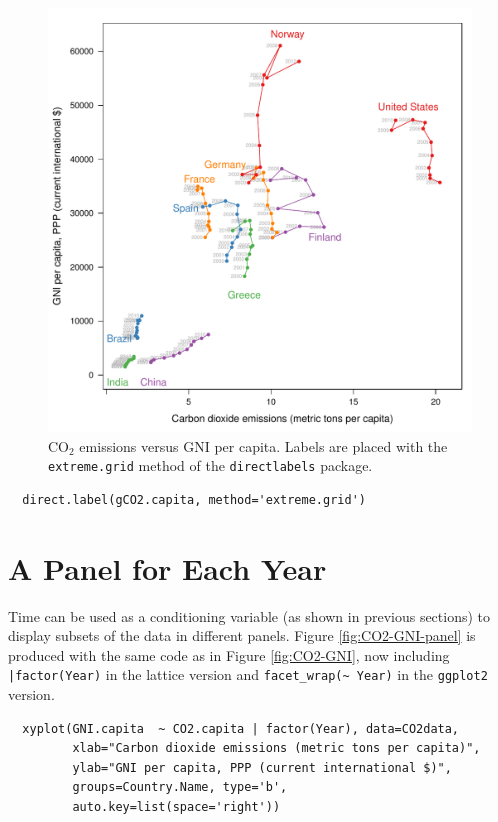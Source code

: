 \documentclass[smallroyalvopaper]{memoir}
\begin{document}
\begin{figure}[htbp]
\centering
\includegraphics[width=.9\linewidth]{figs/CO2_capitaDL.pdf}
\caption{\(\mathrm{CO_2}\) emissions versus GNI per capita. Labels are placed with the \texttt{extreme.grid} method of the \texttt{directlabels} package. \label{fig:CO2-GNI-DL}}
\end{figure}

\lstset{language=r,label= ,caption= ,captionpos=b,numbers=none}
\begin{lstlisting}
  direct.label(gCO2.capita, method='extreme.grid')
\end{lstlisting}

\section{A Panel for Each Year}
\label{sec:orga136fcf}
Time can be used as a conditioning variable (as shown in previous
sections) to display subsets of the data in different panels. Figure
\ref{fig:CO2-GNI-panel} is produced with the same code as in Figure
\ref{fig:CO2-GNI}, now including \texttt{|factor(Year)} in the lattice
version and \texttt{facet\_wrap(\textasciitilde{} Year)} in the \texttt{ggplot2} version.

\lstset{language=r,label= ,caption= ,captionpos=b,numbers=none}
\begin{lstlisting}
  xyplot(GNI.capita  ~ CO2.capita | factor(Year), data=CO2data,
         xlab="Carbon dioxide emissions (metric tons per capita)",
         ylab="GNI per capita, PPP (current international $)",
         groups=Country.Name, type='b',
         auto.key=list(space='right'))
\end{lstlisting}
\end{document}
